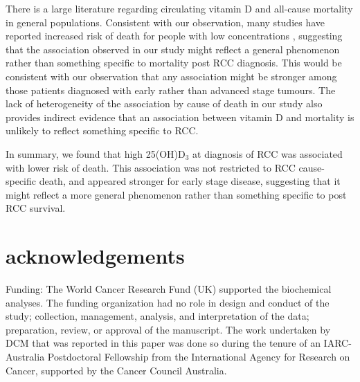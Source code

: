 \documentclass[a4paper,11pt]{article}
\begin{document}
There is a large literature regarding circulating vitamin D and all-cause 
mortality in general populations. Consistent with our observation, many studies 
have reported increased risk of death for people with low concentrations 
\cite{schottker_strong_2013, virtanen_association_2011, hutchinson_low_2010, 
szulc_serum_2009, semba_low_2009, pilz_vitamin_2009, 
melamed_ml_25-hydroxyvitamin_2008, jia_nutritional_2007}, suggesting that 
the association observed in our study might reflect a general phenomenon rather 
than something specific to mortality post RCC diagnosis. This would be 
consistent with our observation that any association might be stronger among 
those patients diagnosed with early rather than advanced stage tumours. The 
lack of heterogeneity of the association by cause of death in our study also 
provides indirect evidence that an association between vitamin D and mortality 
is unlikely to reflect something specific to RCC. 

In summary, we found that high 25(OH)D$_3$ at diagnosis of RCC was associated 
with lower risk of death. This association was not restricted to RCC 
cause-specific death, and appeared stronger for early stage disease, suggesting 
that it might reflect a more general phenomenon rather than something 
specific to post RCC survival.  

\section*{acknowledgements}
\noindent Funding:
The World Cancer Research Fund (UK) supported the biochemical analyses. The 
funding organization had no role in design and conduct of the study; collection, 
management, analysis, and interpretation of the data; preparation, review, or 
approval of the manuscript. The work undertaken by DCM that was reported in this 
paper was done so during the tenure of an IARC-Australia Postdoctoral Fellowship 
from the International Agency for Research on Cancer, supported by the Cancer 
Council Australia. 

\clearpage


\end{document}

